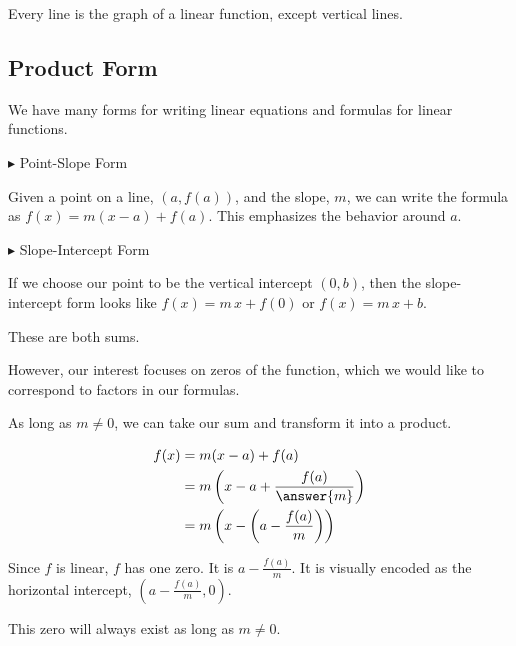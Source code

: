 \documentclass{ximera}
\begin{document}
Every line is the graph of a linear function, except vertical lines. \\






























\subsection*{Product Form}


We have many forms for writing linear equations and formulas for linear functions.



$\blacktriangleright$ Point-Slope Form

Given a point on a line, $(a, f(a))$, and the slope, $m$, we can write the formula as $f(x) = m(x-a) + f(a)$. This emphasizes the behavior around $a$.



$\blacktriangleright$ Slope-Intercept Form

If we choose our point to be the vertical intercept $(0, b)$, then the slope-intercept form looks like $f(x) = m \, x + f(0)$ or $f(x) = m \, x + b$.



These are both sums.


However, our interest focuses on zeros of the function, which we would like to correspond to factors in our formulas.  




\begin{model}



As long as $m \ne 0$, we can take our sum and transform it into a product.




\begin{align*}
f(x) & = m(x-a) + f(a) \\
& = m \left(x - a + \frac{f(a)}{\answer{m}}\right)  \\
& = m \left(x - \left(a - \frac{f(a)}{m}\right)\right) 
\end{align*}



Since $f$ is linear, $f$ has one zero.  It is $a - \frac{f(a)}{m}$.  It is visually encoded as the horizontal intercept, $\left(a - \frac{f(a)}{m}, 0\right)$.


This zero will always exist as long as $m \ne 0$.


\end{model}
\end{document}
